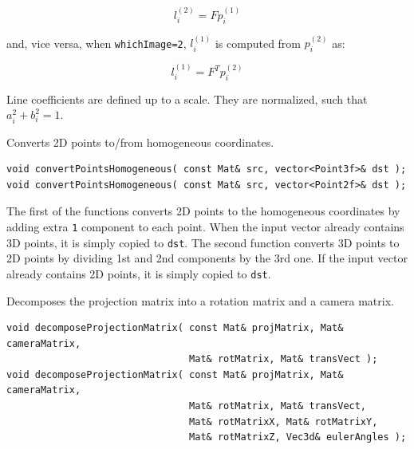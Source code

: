 \begin{description}
\[ l^{(2)}_i = F p^{(1)}_i \]

and, vice versa, when \texttt{whichImage=2}, $l^{(1)}_i$ is computed from $p^{(2)}_i$ as:

\[ l^{(1)}_i = F^T p^{(2)}_i \]

Line coefficients are defined up to a scale. They are normalized, such that $a_i^2+b_i^2=1$.

\label{convertPointHomogeneous}
Converts 2D points to/from homogeneous coordinates.

\begin{lstlisting}
void convertPointsHomogeneous( const Mat& src, vector<Point3f>& dst );
void convertPointsHomogeneous( const Mat& src, vector<Point2f>& dst );
\end{lstlisting}
\end{description}

The first of the functions converts 2D points to the homogeneous coordinates by adding extra \texttt{1} component to each point. When the input vector already contains 3D points, it is simply copied to \texttt{dst}. The second function converts 3D points to 2D points by dividing 1st and 2nd components by the 3rd one. If the input vector already contains 2D points, it is simply copied to \texttt{dst}.

\label{decomposeProjectionMatrix}
Decomposes the projection matrix into a rotation matrix and a camera matrix.

\begin{lstlisting}
void decomposeProjectionMatrix( const Mat& projMatrix, Mat& cameraMatrix,
                                Mat& rotMatrix, Mat& transVect );
void decomposeProjectionMatrix( const Mat& projMatrix, Mat& cameraMatrix,
                                Mat& rotMatrix, Mat& transVect,
                                Mat& rotMatrixX, Mat& rotMatrixY,
                                Mat& rotMatrixZ, Vec3d& eulerAngles );
\end{lstlisting}
\begin{description}
\end{description}

